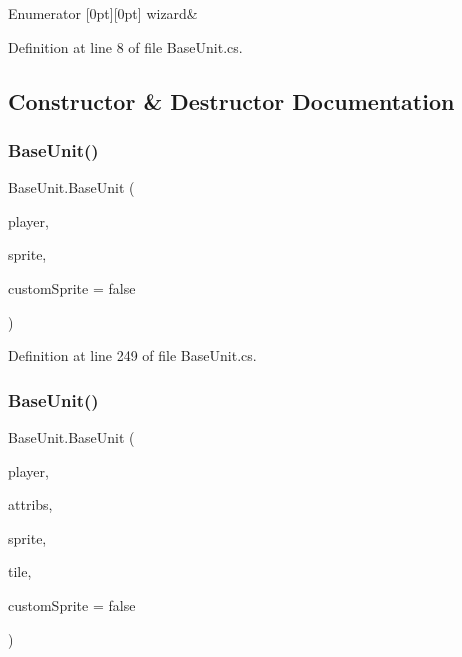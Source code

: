 \begin{DoxyEnumFields}{Enumerator}
[0pt][0pt]{}\mbox{\label{class_base_unit_a086712791ce1a3cb5dc6448d8bbc1f62ad8d3a01ba7e5d44394b6f0a8533f4647}} 
wizard&\\
\hline

\end{DoxyEnumFields}


Definition at line 8 of file Base\+Unit.\+cs.



\subsection{Constructor \& Destructor Documentation}
\mbox{\label{class_base_unit_a039c2e87402c3edaa8637e3be14b34b8}} 
\subsubsection{\texorpdfstring{BaseUnit()}{BaseUnit()}\hspace{0.1cm}{\footnotesize\ttfamily [1/2]}}
{\footnotesize\ttfamily Base\+Unit.\+Base\+Unit (\begin{DoxyParamCaption}\item[{bool}]{player,  }\item[{\mbox{\hyperlink{class_base_unit_a086712791ce1a3cb5dc6448d8bbc1f62}{Sprite\+Preset}}}]{sprite,  }\item[{bool}]{custom\+Sprite = {\ttfamily false} }\end{DoxyParamCaption})}



Definition at line 249 of file Base\+Unit.\+cs.

\mbox{\label{class_base_unit_a2c6cc9c0c1a13df230bb2a3b3622448b}} 
\subsubsection{\texorpdfstring{BaseUnit()}{BaseUnit()}\hspace{0.1cm}{\footnotesize\ttfamily [2/2]}}
{\footnotesize\ttfamily Base\+Unit.\+Base\+Unit (\begin{DoxyParamCaption}\item[{bool}]{player,  }\item[{\mbox{\hyperlink{class_attributes_a2dcc4757e5dd7b7d518f43f4f194d175}{Attributes.\+Preset}}}]{attribs,  }\item[{\mbox{\hyperlink{class_base_unit_a086712791ce1a3cb5dc6448d8bbc1f62}{Sprite\+Preset}}}]{sprite,  }\item[{\mbox{\hyperlink{class_tile}{Tile}}}]{tile,  }\item[{bool}]{custom\+Sprite = {\ttfamily false} }\end{DoxyParamCaption})}



